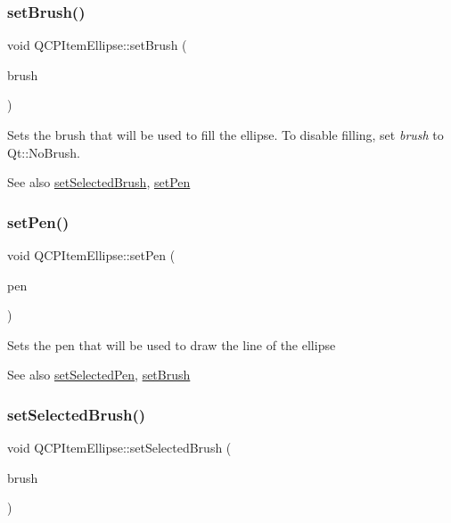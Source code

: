 \subsubsection{\texorpdfstring{set\+Brush()}{setBrush()}}
{\footnotesize\ttfamily void Q\+C\+P\+Item\+Ellipse\+::set\+Brush (\begin{DoxyParamCaption}\item[{const Q\+Brush \&}]{brush }\end{DoxyParamCaption})}

Sets the brush that will be used to fill the ellipse. To disable filling, set {\itshape brush} to Qt\+::\+No\+Brush.

\begin{DoxySeeAlso}{See also}
\hyperlink{class_q_c_p_item_ellipse_a9693501cfaa43a099655c75bed0dab3f}{set\+Selected\+Brush}, \hyperlink{class_q_c_p_item_ellipse_adb81a663ed2420fcfa011e49f678d1a6}{set\+Pen} 
\end{DoxySeeAlso}
\mbox{\label{class_q_c_p_item_ellipse_adb81a663ed2420fcfa011e49f678d1a6}} 
\subsubsection{\texorpdfstring{set\+Pen()}{setPen()}}
{\footnotesize\ttfamily void Q\+C\+P\+Item\+Ellipse\+::set\+Pen (\begin{DoxyParamCaption}\item[{const Q\+Pen \&}]{pen }\end{DoxyParamCaption})}

Sets the pen that will be used to draw the line of the ellipse

\begin{DoxySeeAlso}{See also}
\hyperlink{class_q_c_p_item_ellipse_a6c542fba1dc918041c583f58a50dde99}{set\+Selected\+Pen}, \hyperlink{class_q_c_p_item_ellipse_a49fc74e6965834e873d027d026def798}{set\+Brush} 
\end{DoxySeeAlso}
\mbox{\label{class_q_c_p_item_ellipse_a9693501cfaa43a099655c75bed0dab3f}} 
\subsubsection{\texorpdfstring{set\+Selected\+Brush()}{setSelectedBrush()}}
{\footnotesize\ttfamily void Q\+C\+P\+Item\+Ellipse\+::set\+Selected\+Brush (\begin{DoxyParamCaption}\item[{const Q\+Brush \&}]{brush }\end{DoxyParamCaption})}

